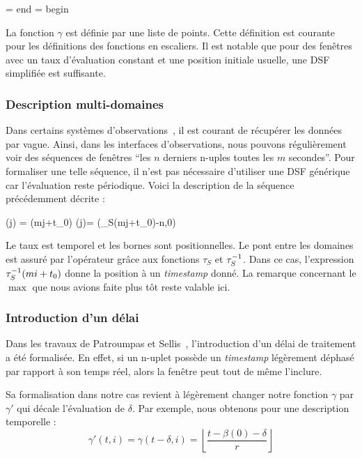 \DSF{\gamma(t,i) = \displaystyle\sum_{i=0}^{+\infty} u_i \indic_{[u_i, u_{i+1}[}(t)}
	{\beta = \textrm{end}}
	{\alpha = \textrm{begin}}

La fonction $\gamma$ est définie par une liste de points. Cette définition est courante pour les définitions des fonctions en escaliers. Il est notable que pour des fenêtres avec un taux d'évaluation constant et une position initiale usuelle, une DSF simplifiée est suffisante. 
\subsubsection{Description multi-domaines}
Dans certains systèmes d'observations~\cite{Jurdak:sumac}, il est courant de récupérer les données par vague. Ainsi, dans les interfaces d'observations, nous pouvons régulièrement voir des séquences de fenêtres \enquote{les $n$ derniers n-uples toutes les $m$ secondes}. Pour formaliser une telle séquence, il n'est pas nécessaire d'utiliser une DSF générique car l'évaluation reste périodique. Voici la description de la séquence précédemment décrite :

	{\beta(j) = \rtau(mj+t_0)}
	{\alpha(j)= \max(\rtau_S(mj+t_0)-n,0)}

Le taux est temporel et les bornes sont positionnelles. Le pont entre les domaines est assuré par l'opérateur grâce aux fonctions $\tau_S$ et $\tau^{-1}_S$. Dans ce cas, l'expression $\tau^{-1}_S(mi+t_0)$ donne la position à un \textit{timestamp} donné. La remarque concernant le $\max$ que nous avions faite plus tôt reste valable ici.

\subsubsection{Introduction d'un délai}
Dans les travaux de Patroumpas et Sellis~\cite{Patroumpas:window}, l'introduction d'un délai de traitement a été formalisée. En effet, si un n-uplet possède un \textit{timestamp} légèrement déphasé par rapport à son temps réel, alors la fenêtre peut tout de même l'inclure.

Sa formalisation dans notre cas revient à légèrement changer notre fonction $\gamma$ par $\gamma'$ qui décale l'évaluation de $\delta$. Par exemple, nous obtenons pour une description temporelle : $$\gamma'(t,i) = \gamma(t-\delta,i) = \left\lfloor\frac{t-\beta(0)-\delta}{r}\right\rfloor$$

